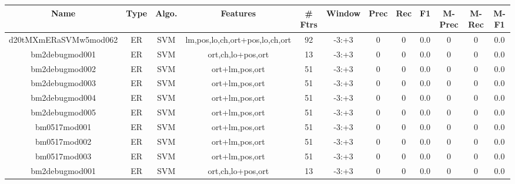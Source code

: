 \documentclass[a4paper]{article}
\begin{document}
\begin{landscape}
\begin{center}
\begin{tabular}{ |c|c|c|c|c|c|c|c|c|c|c|c|} 
 \hline
 	Name & Type & Algo. & Features & \# Ftrs & Window & Prec & Rec & F1 & M-Prec & M-Rec & M-F1\\
 \hline

 	

 
 	
 	\small{ d20tMXmERaSVMw5mod062 } & ER & SVM & lm,pos,lo,ch,ort+pos,lo,ch,ort  &  92 &  -3:+3  &  0 & 0 & 0.0  &  0 & 0 & 0.0 \\
 	

 
 	
 	\small{ bm2debugmod001 } & ER & SVM & ort,ch,lo+pos,ort  &  13 &  -3:+3  &  0 & 0 & 0.0  &  0 & 0 & 0.0 \\
 	

 
 	
 	\small{ bm2debugmod002 } & ER & SVM & ort+lm,pos,ort  &  51 &  -3:+3  &  0 & 0 & 0.0  &  0 & 0 & 0.0 \\
 	

 
 	
 	\small{ bm2debugmod003 } & ER & SVM & ort+lm,pos,ort  &  51 &  -3:+3  &  0 & 0 & 0.0  &  0 & 0 & 0.0 \\
 	

 
 	
 	\small{ bm2debugmod004 } & ER & SVM & ort+lm,pos,ort  &  51 &  -3:+3  &  0 & 0 & 0.0  &  0 & 0 & 0.0 \\
 	

 
 	
 	\small{ bm2debugmod005 } & ER & SVM & ort+lm,pos,ort  &  51 &  -3:+3  &  0 & 0 & 0.0  &  0 & 0 & 0.0 \\
 	

 
 	
 	\small{ bm0517mod001 } & ER & SVM & ort+lm,pos,ort  &  51 &  -3:+3  &  0 & 0 & 0.0  &  0 & 0 & 0.0 \\
 	

 
 	
 	\small{ bm0517mod002 } & ER & SVM & ort+lm,pos,ort  &  51 &  -3:+3  &  0 & 0 & 0.0  &  0 & 0 & 0.0 \\
 	

 
 	
 	\small{ bm0517mod003 } & ER & SVM & ort+lm,pos,ort  &  51 &  -3:+3  &  0 & 0 & 0.0  &  0 & 0 & 0.0 \\
 	

 
 	
 	\small{ bm2debugmod001 } & ER & SVM & ort,ch,lo+pos,ort  &  13 &  -3:+3  &  0 & 0 & 0.0  &  0 & 0 & 0.0 \\
 	


\end{tabular}
\end{center}
\end{landscape}
\end{document}
